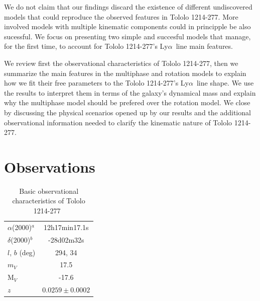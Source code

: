 \documentclass[a4,useAMS,usenatbib,usegraphicx]{mn2e}
\newcommand{\tol}{Tololo 1214-277}
\newcommand{\lya}{Ly$\alpha$}
\begin{document}
We do not claim that our findings discard the existence of different
undiscovered models that could reproduce the observed features in \tol.
More involved models with multiple kinematic components could
in principple be also sucessful.
We focus on presenting two simple and succesful models that
manage, for the first time, to account for \tol's \lya\ line main
features. 

We review first the observational characteristics of
\tol, then we summarize the main features in the multiphase and
rotation models to explain how we fit their free parameters 
to the \tol's \lya\ line shape.
We use the results to interpret them in terms of the galaxy's
dynamical mass and explain why the multiphase model should be prefered
over the rotation model.
We close by discussing the physical scenarios opened up by our
results and the additional observational information needed to clarify
the kinematic nature of \tol.


\section{Observations}


\begin{table}
\begin{center}
\begin{tabular}{lc}\hline
$\alpha$(2000)$^{a}$ & 12h17min17.1s\\
$\delta$(2000)$^{b}$ & -28d02m32s\\
$l$, $b$ (deg) & 294, 34\\
$m_V$ & 17.5\\
  M$_V$ & -17.6\\ 
$z$ & $0.0259\pm0.0002$ \\\hline
\end{tabular}
\end{center}
\caption{Basic observational characteristics of \tol\ 
  \citep{Thuan97}\label{obstable}} 
\end{table}
\end{document}
